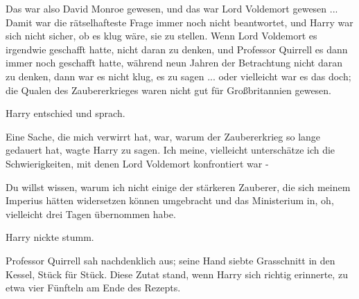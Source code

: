 Das war also David Monroe gewesen, und das war Lord Voldemort gewesen ... Damit
war die rätselhafteste Frage immer noch nicht beantwortet, und Harry war sich
nicht sicher, ob es klug wäre, sie zu stellen. Wenn Lord Voldemort es irgendwie
geschafft hatte, nicht daran zu denken, und Professor Quirrell es dann immer
noch geschafft hatte, während neun Jahren der Betrachtung nicht daran zu denken,
dann war es nicht klug, es zu sagen ... oder vielleicht war es das doch; die
Qualen des Zaubererkrieges waren nicht gut für Großbritannien gewesen.

Harry entschied und sprach.

\glqq{}Eine Sache, die mich verwirrt hat, war, warum der Zaubererkrieg so lange
gedauert hat\grqq{}, wagte Harry zu sagen. \glqq{}Ich meine, vielleicht
unterschätze ich die Schwierigkeiten, mit denen Lord Voldemort konfrontiert war
-\grqq{}

\glqq{}Du willst wissen, warum ich nicht einige der stärkeren Zauberer, die sich
meinem Imperius hätten widersetzen können umgebracht und das Ministerium in, oh,
vielleicht drei Tagen übernommen habe.\grqq{}

Harry nickte stumm.

Professor Quirrell sah nachdenklich aus; seine Hand siebte Grasschnitt in den
Kessel, Stück für Stück. Diese Zutat stand, wenn Harry sich richtig erinnerte,
zu etwa vier Fünfteln am Ende des Rezepts.

